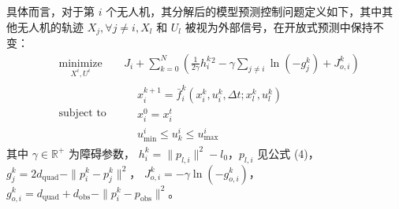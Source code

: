 \documentclass[lang=chs, degree=master, blindreview=false, winfonts=true]{yanputhesis}
\begin{document}
具体而言，对于第 $i$ 个无人机，其分解后的模型预测控制问题定义如下，其中其他无人机的轨迹 $X_j, \forall j \neq i, X_l$ 和 $U_l$ 被视为外部信号，在开放式预测中保持不变：
\begin{equation}
	\begin{aligned} 
	&\operatorname*{minimize}_{X^i,U^i}& & J_i + \sum_{k=0}^{N} \left( \frac{1}{2\gamma} h_i^k{}^2 - \gamma \sum_{j \neq i} \ln(-g_j^k) + J_{o,i}^k \right)\\
	&\text{subject to}& & \begin{aligned}
& x_i^{k+1} = \bar{f}_i^k(x_i^k, u_i^k, \Delta t; x_l^k, u_l^k) \\
& x_i^0 = x_i^t\\
& u^i_{\text{min}} \leq u^i_k \leq u^i_{\text{max}}		\end{aligned}	
\end{aligned}
\label{multiuav}
\end{equation}
其中
$\gamma \in \mathbb{R}^+$ 为障碍参数，
$h_i^k = \|p_{l,i}\|^2 - l_0$，$p_{l,i}$ 见公式 (4)，
$g_j^k = 2d_{\text{quad}} - \|p_i^k - p_j^k\|^2$，
$J_{o,i}^k = -\gamma \ln(-g_{o,i}^k)$，
$g_{o,i}^k = d_{\text{quad}} + d_{\text{obs}} - \|p_i^k - p_{\text{obs}}\|^2$。
\end{document}
